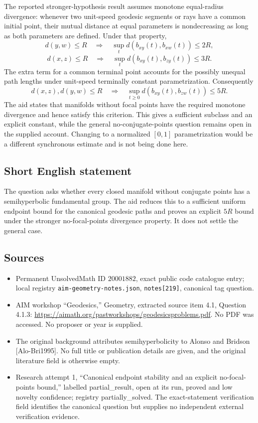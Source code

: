 \documentclass[11pt]{article}
\begin{document}
The reported stronger-hypothesis result assumes monotone equal-radius divergence: whenever two unit-speed geodesic segments or rays have a common initial point, their mutual distance at equal parameters is nondecreasing as long as both parameters are defined. Under that property,
\[
 d(y,w)\leq R\quad\Longrightarrow\quad
 \sup_t d(b_{xy}(t),b_{xw}(t))\leq2R,
\]
\[
 d(x,z)\leq R\quad\Longrightarrow\quad
 \sup_t d(b_{xy}(t),b_{zy}(t))\leq3R.
\]
The extra term for a common terminal point accounts for the possibly unequal path lengths under unit-speed terminally constant parametrization. Consequently
\[
 d(x,z),d(y,w)\leq R\quad\Longrightarrow\quad
 \sup_{t\geq0}d(b_{xy}(t),b_{zw}(t))\leq5R.
\]
The aid states that manifolds without focal points have the required monotone divergence and hence satisfy this criterion. This gives a sufficient subclass and an explicit constant, while the general no-conjugate-points question remains open in the supplied account. Changing to a normalized \([0,1]\) parametrization would be a different synchronous estimate and is not being done here.
\subsection{Short English statement}
The question asks whether every closed manifold without conjugate points has a semihyperbolic fundamental group. The aid reduces this to a sufficient uniform endpoint bound for the canonical geodesic paths and proves an explicit \(5R\) bound under the stronger no-focal-points divergence property. It does not settle the general case.
\subsection{Sources}
\begin{itemize}
\item Permanent UnsolvedMath ID \(20001882\), exact public code catalogue entry; local registry \texttt{aim-geometry-notes.json}, \texttt{notes[219]}, canonical tag question.
\item AIM workshop ``Geodesics,'' Geometry, extracted source item 4.1, Question 4.1.3: \url{https://aimath.org/pastworkshops/geodesicsproblems.pdf}. No PDF was accessed. No proposer or year is supplied.
\item The original background attributes semihyperbolicity to Alonso and Bridson [Alo-Bri1995]. No full title or publication details are given, and the original literature field is otherwise empty.
\item Research attempt 1, ``Canonical endpoint stability and an explicit no-focal-points bound,'' labelled partial\_result, open at its run, proved and low novelty confidence; registry partially\_solved. The exact-statement verification field identifies the canonical question but supplies no independent external verification evidence.
\end{itemize}
\end{document}
